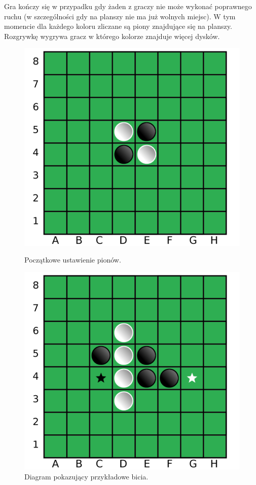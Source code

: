 \documentclass[10pt]{article}
\begin{document}
Gra kończy się w przypadku gdy żaden z graczy nie może wykonać poprawnego ruchu (w szczególności gdy na planszy nie ma już wolnych miejsc). W tym momencie dla każdego koloru zliczane są piony znajdujące się na planszy. Rozgrywkę wygrywa gracz w którego kolorze znajduje więcej dysków.
\begin{figure}[H]
  \centering
  \begin{minipage}{0.49\textwidth}
    \includegraphics[width=\textwidth]{images/othello3.png}
    \caption{Początkowe ustawienie pionów.}
  \end{minipage}
  \begin{minipage}{0.49\textwidth}
    \includegraphics[width=\textwidth]{images/othello1.png}
    \caption{Diagram pokazujący przykładowe bicia.}
    \label{fig:bicia}
  \end{minipage}
\end{figure}
\end{document}
